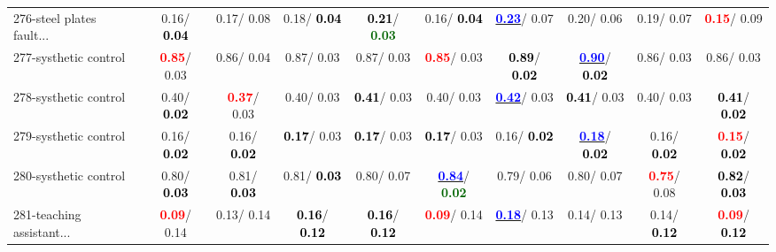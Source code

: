 \begin{table}[h]
\begin{center}
{\begin{tabular}{lc|c|c|c|c|c|c|c|c}
276-steel plates fault... &   0.16/\textcolor{black}{\textbf{  0.04}} &   0.17/  0.08 &   0.18/\textcolor{black}{\textbf{  0.04}} & \textcolor{black}{\textbf{  0.21}}/\textcolor{darkgreen}{\textbf{  0.03}} &   0.16/\textcolor{black}{\textbf{  0.04}} & \underline{\textcolor{blue}{\textbf{  0.23}}}/  0.07 &   0.20/  0.06 &   0.19/  0.07 & \textcolor{red}{\textbf{  0.15}}/  0.09 \\
277-systhetic control & \textcolor{red}{\textbf{  0.85}}/  0.03 &   0.86/  0.04 &   0.87/  0.03 &   0.87/  0.03 & \textcolor{red}{\textbf{  0.85}}/  0.03 & \textcolor{black}{\textbf{  0.89}}/\textcolor{black}{\textbf{  0.02}} & \underline{\textcolor{blue}{\textbf{  0.90}}}/\textcolor{black}{\textbf{  0.02}} &   0.86/  0.03 &   0.86/  0.03 \\ \hline
278-systhetic control &   0.40/\textcolor{black}{\textbf{  0.02}} & \textcolor{red}{\textbf{  0.37}}/  0.03 &   0.40/  0.03 & \textcolor{black}{\textbf{  0.41}}/  0.03 &   0.40/  0.03 & \underline{\textcolor{blue}{\textbf{  0.42}}}/  0.03 & \textcolor{black}{\textbf{  0.41}}/  0.03 &   0.40/  0.03 & \textcolor{black}{\textbf{  0.41}}/\textcolor{black}{\textbf{  0.02}} \\
279-systhetic control &   0.16/\textcolor{black}{\textbf{  0.02}} &   0.16/\textcolor{black}{\textbf{  0.02}} & \textcolor{black}{\textbf{  0.17}}/  0.03 & \textcolor{black}{\textbf{  0.17}}/  0.03 & \textcolor{black}{\textbf{  0.17}}/  0.03 &   0.16/\textcolor{black}{\textbf{  0.02}} & \underline{\textcolor{blue}{\textbf{  0.18}}}/\textcolor{black}{\textbf{  0.02}} &   0.16/\textcolor{black}{\textbf{  0.02}} & \textcolor{red}{\textbf{  0.15}}/\textcolor{black}{\textbf{  0.02}} \\
280-systhetic control &   0.80/\textcolor{black}{\textbf{  0.03}} &   0.81/\textcolor{black}{\textbf{  0.03}} &   0.81/\textcolor{black}{\textbf{  0.03}} &   0.80/  0.07 & \underline{\textcolor{blue}{\textbf{  0.84}}}/\textcolor{darkgreen}{\textbf{  0.02}} &   0.79/  0.06 &   0.80/  0.07 & \textcolor{red}{\textbf{  0.75}}/  0.08 & \textcolor{black}{\textbf{  0.82}}/\textcolor{black}{\textbf{  0.03}} \\
281-teaching assistant... & \textcolor{red}{\textbf{  0.09}}/  0.14 &   0.13/  0.14 & \textcolor{black}{\textbf{  0.16}}/\textcolor{black}{\textbf{  0.12}} & \textcolor{black}{\textbf{  0.16}}/\textcolor{black}{\textbf{  0.12}} & \textcolor{red}{\textbf{  0.09}}/  0.14 & \underline{\textcolor{blue}{\textbf{  0.18}}}/  0.13 &   0.14/  0.13 &   0.14/\textcolor{black}{\textbf{  0.12}} & \textcolor{red}{\textbf{  0.09}}/\textcolor{black}{\textbf{  0.12}} \\

\end{tabular}}
\end{center}
\end{table}
